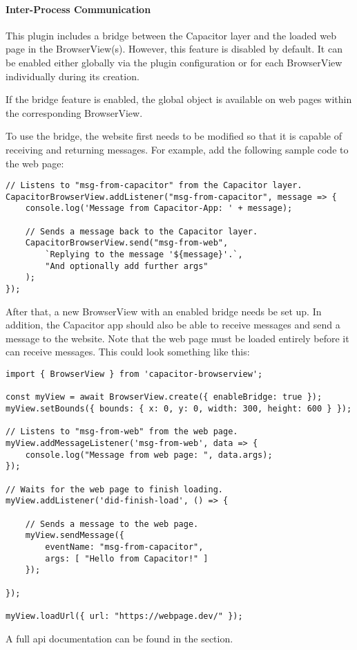 \newpage

\paragraph{Inter-Process Communication}
\label{sec:Capacitor-BrowserView:InterprocessCommunication}

This plugin includes a bridge between the Capacitor layer and the loaded web page in the BrowserView(s).
However, this feature is disabled by default. It can be enabled either globally via the plugin configuration or for each BrowserView individually during its creation.

If the bridge feature is enabled, the global object  is available on web pages within the corresponding BrowserView.

To use the bridge, the website first needs to be modified so that it is capable of receiving and returning messages.
For example, add the following sample code to the web page:

\begin{verbatim}
// Listens to "msg-from-capacitor" from the Capacitor layer.
CapacitorBrowserView.addListener("msg-from-capacitor", message => {
    console.log('Message from Capacitor-App: ' + message);

    // Sends a message back to the Capacitor layer.
    CapacitorBrowserView.send("msg-from-web",
        `Replying to the message '${message}'.`,
        "And optionally add further args"
    );
});
\end{verbatim}

After that, a new BrowserView with an enabled bridge needs be set up.
In addition, the Capacitor app should also be able to receive messages and send a message to the website.
Note that the web page must be loaded entirely before it can receive messages.
This could look something like this:

\begin{verbatim}
import { BrowserView } from 'capacitor-browserview';

const myView = await BrowserView.create({ enableBridge: true });
myView.setBounds({ bounds: { x: 0, y: 0, width: 300, height: 600 } });

// Listens to "msg-from-web" from the web page.
myView.addMessageListener('msg-from-web', data => {
    console.log("Message from web page: ", data.args);
});

// Waits for the web page to finish loading.
myView.addListener('did-finish-load', () => {

    // Sends a message to the web page.
    myView.sendMessage({
        eventName: "msg-from-capacitor",
        args: [ "Hello from Capacitor!" ]
    });

});

myView.loadUrl({ url: "https://webpage.dev/" });
\end{verbatim}

A full \ac{api} documentation can be found in the  section.
